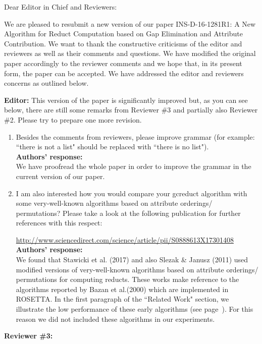 \documentclass{letter}
\begin{document}
\begin{letter}{}
  \opening{Dear Editor in Chief and Reviewers:}

  We are pleased to resubmit a new version of our paper INS-D-16-1281R1: A New Algorithm for Reduct Computation based on Gap Elimination and Attribute Contribution. We want to thank the constructive criticisms of the editor and reviewers as well as their comments and questions. We have modified the original paper accordingly to the reviewer comments and we hope that, in its present form, the paper can be accepted. We have addressed the editor and reviewers concerns as outlined below.

  \textbf{Editor:} 
  This version of the paper is significantly improved but, as you can see below, there are still some remarks from Reviewer \#3 and partially also Reviewer \#2. Please try to prepare one more revision.
  \begin{enumerate}
	\item Besides the comments from reviewers, please improve grammar (for example: ``there is not a list" should be replaced with ``there is no list"). \\
	\textbf{Authors’ response:} \\
	We have proofread the whole paper in order to improve the grammar in the current version of our paper.
		 
	\item I am also interested how you would compare your gcreduct algorithm with some very-well-known algorithms based on attribute orderings/ permutations? Please take a look at the following publication for further references with this respect:
  
	\small{\url{ http://www.sciencedirect.com/science/article/pii/S0888613X17301408}}\\
	\normalsize
	\textbf{Authors’ response:} \\
	We found that Stawicki et al. (2017) and also Slezak \& Janusz (2011) used modified versions of very-well-known algorithms based on attribute orderings/ permutations for computing reducts. These works make reference to the algorithms reported by Bazan et al.(2000) which are implemented in ROSETTA. In the first paragraph of the ``Related Work" section, we illustrate the low performance of these early algorithms (see page~\pageref{early}). For this reason we did not included these algorithms in our experiments.
  \end{enumerate}
  
  \textbf{Reviewer \#3:}
  

\end{letter}
\end{document}
